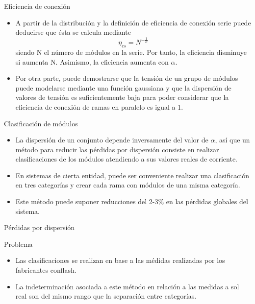 \documentclass[xcolor={usenames,svgnames,dvipsnames}]{beamer}
\begin{document}
\begin{frame}[label={sec:org239b0d8}]{Eficiencia de conexión}
\begin{itemize}
\item A partir de la distribución y la definición de eficiencia de conexión serie puede deducirse que ésta se calcula mediante $$\eta_{cs}=N^{-\frac{1}{\alpha}}$$ siendo N el número de módulos en la serie. Por tanto, \alert{la eficiencia disminuye si aumenta N}. Asimismo, la eficiencia aumenta con \(\alpha\).

\item Por otra parte, puede demostrarse que la \alert{tensión de un grupo de módulos} puede modelarse mediante una función \alert{gaussiana} y que \alert{la dispersión de valores de tensión es suficientemente baja para poder  considerar que la eficiencia de conexión de ramas en paralelo es igual a 1.}
\end{itemize}
\end{frame}

\begin{frame}[label={sec:org05fc55b}]{Clasificación de módulos}
\begin{itemize}
\item La dispersión de un conjunto depende inversamente del valor de
\(\alpha\), así que un \alert{método para reducir las pérdidas por
dispersión} consiste en \alert{realizar clasificaciones} de los módulos
atendiendo a sus valores reales de corriente.

\item En sistemas de cierta entidad, puede ser conveniente realizar una
clasificación en tres categorías y crear cada rama con módulos de una
misma categoría.

\item Este método puede suponer reducciones del 2-3\% en las pérdidas
globales del sistema.
\end{itemize}
\end{frame}

\begin{frame}[label={sec:org033709a}]{Pérdidas por dispersión}
\begin{block}{Problema}
\begin{itemize}
\item Las clasificaciones se realizan en base a las médidas realizadas por
los fabricantes con\guillemotleft{}flash\guillemotright{}.

\item \alert{La indeterminación asociada a este método en relación a las medidas
a sol real son del mismo rango que la separación entre categorías.}
\end{itemize}
\end{block}
\end{frame}
\end{document}
